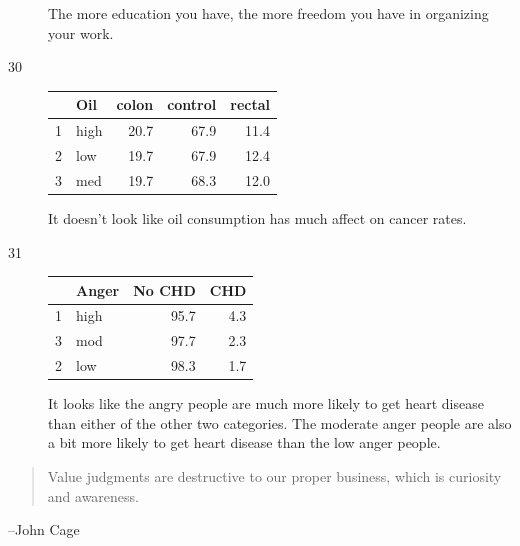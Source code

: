 \documentclass[letterpaper, landscape]{exam}
\begin{document}
\begin{description}
      The more education you have, the more freedom you have in organizing your work.

    \item[30]
      \begin{table}[H]
        \centering
        \begin{tabular}{rlrrr}
          \toprule
            & Oil  & colon & control & rectal \\
          \midrule
          1 & high & 20.7  & 67.9    & 11.4 \\
          2 & low  & 19.7  & 67.9    & 12.4 \\
          3 & med  & 19.7  & 68.3    & 12.0 \\
          \bottomrule
        \end{tabular}
      \end{table}

      It doesn't look like oil consumption has much affect on cancer rates.

    \item[31]
      \begin{table}[H]
        \centering
        \begin{tabular}{rlrr}
          \toprule
            & Anger & No CHD & CHD \\
          \midrule
          1 & high  & 95.7   & 4.3 \\
          3 & mod   & 97.7   & 2.3 \\
          2 & low   & 98.3   & 1.7 \\
          \bottomrule
        \end{tabular}
      \end{table}

      It looks like the angry people are much more likely to get heart disease than
      either of the other two categories.  The moderate anger people are also a bit
      more likely to get heart disease than the low anger people.

  \end{description}

  \else
    \vspace{12 cm}
    \begin{quote}
      \begin{em}
        Value judgments are destructive to our proper business, which is
        curiosity and awareness. 
      \end{em}
    \end{quote}
    \hspace{1 cm} --John Cage
  \fi
\end{document}
